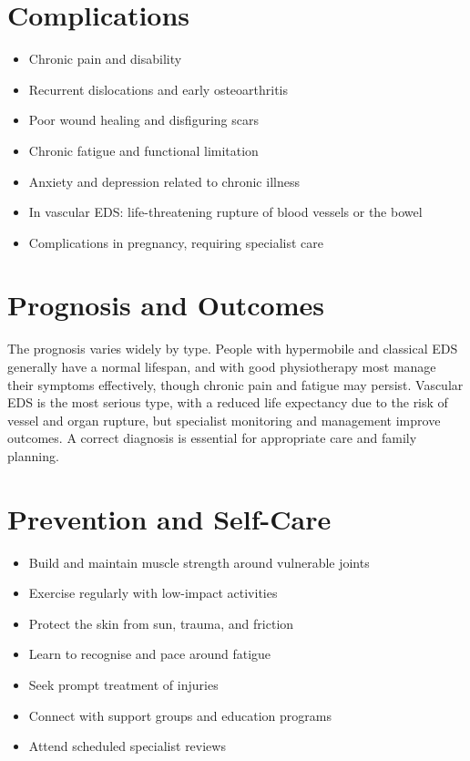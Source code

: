 \section*{Complications}
\begin{itemize}
    \item Chronic pain and disability
    \item Recurrent dislocations and early osteoarthritis
    \item Poor wound healing and disfiguring scars
    \item Chronic fatigue and functional limitation
    \item Anxiety and depression related to chronic illness
    \item In vascular EDS: life-threatening rupture of blood vessels or the bowel
    \item Complications in pregnancy, requiring specialist care
\end{itemize}

\section*{Prognosis and Outcomes}
The prognosis varies widely by type. People with hypermobile and classical EDS generally have a normal lifespan, and with good physiotherapy most manage their symptoms effectively, though chronic pain and fatigue may persist. Vascular EDS is the most serious type, with a reduced life expectancy due to the risk of vessel and organ rupture, but specialist monitoring and management improve outcomes. A correct diagnosis is essential for appropriate care and family planning.

\section*{Prevention and Self-Care}
\begin{itemize}
    \item Build and maintain muscle strength around vulnerable joints
    \item Exercise regularly with low-impact activities
    \item Protect the skin from sun, trauma, and friction
    \item Learn to recognise and pace around fatigue
    \item Seek prompt treatment of injuries
    \item Connect with support groups and education programs
    \item Attend scheduled specialist reviews
\end{itemize}

